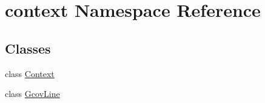 \hypertarget{namespacecontext}{}\section{context Namespace Reference}
\label{namespacecontext}
\subsection*{Classes}
\begin{DoxyCompactItemize}
\item 
class \mbox{\hyperlink{classcontext_1_1Context}{Context}}
\item 
class \mbox{\hyperlink{classcontext_1_1GcovLine}{Gcov\+Line}}
\end{DoxyCompactItemize}
